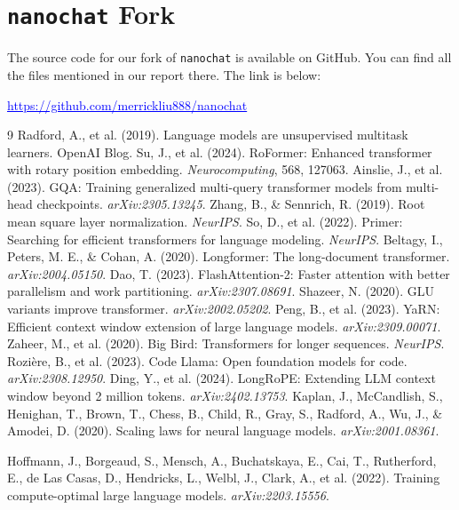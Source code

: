 \documentclass[a4paper,12pt]{article}
\newcommand{\bluehref}[2]{\href{#1}{\textcolor{blue}{\uline{#2}}}}
\begin{document}
\section{\texttt{nanochat} Fork}

The source code for our fork of \texttt{nanochat} is available on GitHub. You can find all the files mentioned in our report there. The link is below:

\bluehref{https://github.com/merrickliu888/nanochat}{https://github.com/merrickliu888/nanochat}

\newpage

\begin{thebibliography}{9}
 Radford, A., et al. (2019). Language models are unsupervised multitask learners. OpenAI Blog.
 Su, J., et al. (2024). RoFormer: Enhanced transformer with rotary position embedding. \textit{Neurocomputing}, 568, 127063.
 Ainslie, J., et al. (2023). GQA: Training generalized multi-query transformer models from multi-head checkpoints. \textit{arXiv:2305.13245}.
 Zhang, B., \& Sennrich, R. (2019). Root mean square layer normalization. \textit{NeurIPS}.
 So, D., et al. (2022). Primer: Searching for efficient transformers for language modeling. \textit{NeurIPS}.
 Beltagy, I., Peters, M. E., \& Cohan, A. (2020). Longformer: The long-document transformer. \textit{arXiv:2004.05150}.
 Dao, T. (2023). FlashAttention-2: Faster attention with better parallelism and work partitioning. \textit{arXiv:2307.08691}.
 Shazeer, N. (2020). GLU variants improve transformer. \textit{arXiv:2002.05202}.
 Peng, B., et al. (2023). YaRN: Efficient context window extension of large language models. \textit{arXiv:2309.00071}.
 Zaheer, M., et al. (2020). Big Bird: Transformers for longer sequences. \textit{NeurIPS}.
 Rozi\`{e}re, B., et al. (2023). Code Llama: Open foundation models for code. \textit{arXiv:2308.12950}.
 Ding, Y., et al. (2024). LongRoPE: Extending LLM context window beyond 2 million tokens. \textit{arXiv:2402.13753}.
Kaplan, J., McCandlish, S., Henighan, T., Brown, T., Chess, B., Child, R., Gray, S., Radford, A., Wu, J., \& Amodei, D. (2020). 
Scaling laws for neural language models. 
\textit{arXiv:2001.08361}.

Hoffmann, J., Borgeaud, S., Mensch, A., Buchatskaya, E., Cai, T., Rutherford, E., de Las Casas, D., Hendricks, L., Welbl, J., Clark, A., et al. (2022). 
Training compute-optimal large language models. 
\textit{arXiv:2203.15556}.
\end{thebibliography}
\end{document}
